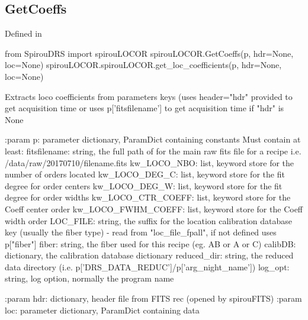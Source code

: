 \begin{minipage}{\textwidth}
\subsection{GetCoeffs}

Defined in \spirouLOCOR{}

\begin{pythonbox}
from SpirouDRS import spirouLOCOR
spirouLOCOR.GetCoeffs(p, hdr=None, loc=None)
spirouLOCOR.spirouLOCOR.get_loc_coefficients(p, hdr=None, loc=None)
\end{pythonbox}

\begin{pythondocstring}
Extracts loco coefficients from parameters keys (uses header="hdr" provided
to get acquisition time or uses p['fitsfilename'] to get acquisition time if
"hdr" is None

:param p: parameter dictionary, ParamDict containing constants
    Must contain at least:
            fitsfilename: string, the full path of for the main raw fits
                          file for a recipe
                          i.e. /data/raw/20170710/filename.fits
            kw_LOCO_NBO: list, keyword store for the number of orders
                         located
            kw_LOCO_DEG_C: list, keyword store for the fit degree for
                           order centers
            kw_LOCO_DEG_W: list, keyword store for the fit degree for
                           order widths
            kw_LOCO_CTR_COEFF: list, keyword store for the Coeff center
                               order
            kw_LOCO_FWHM_COEFF: list, keyword store for the Coeff width
                                order
            LOC_FILE: string, the suffix for the location calibration
                      database key (usually the fiber type)
                         - read from "loc_file_fpall", if not defined
                           uses p["fiber"]
            fiber: string, the fiber used for this recipe (eg. AB or A or C)
            calibDB: dictionary, the calibration database dictionary
            reduced_dir: string, the reduced data directory
                         (i.e. p['DRS_DATA_REDUC']/p['arg_night_name'])
            log_opt: string, log option, normally the program name

:param hdr: dictionary, header file from FITS rec (opened by spirouFITS)
:param loc: parameter dictionary, ParamDict containing data


\end{pythondocstring}
\end{minipage}
